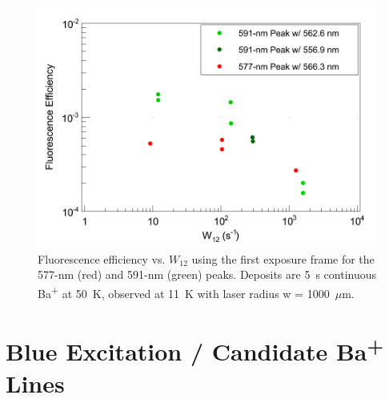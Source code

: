 \begin{figure} %
        \centering
                \includegraphics[width=.7\textwidth]{figures/QE_new_just1000.png}
                \caption{Fluorescence efficiency vs. $W_{12}$ using the first exposure frame for the 577-nm (red) and 591-nm (green) peaks.  Deposits are 5~s continuous Ba\textsuperscript{+} at 50~K, observed at 11~K with laser radius w = 1000~$\mu$m.}
\label{fig:qe}
\end{figure}


\section{Blue Excitation / Candidate Ba\textsuperscript{+} Lines}
\label{sec:BaPlus}


